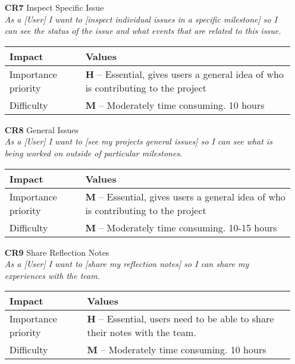 \begin{itemize}
    \item[\textbf{CR7}] Inspect Specific Issue\\
        \textit{\small{As a [User] I want to [inspect individual issues in a specific milestone] so I can see the status of the issue and what events that are related to this issue.}}

        \begin{tabular}{| l | p{8cm} |}
            \hline
            \rowcolor[gray]{0.8}
            \textbf{Impact} & \textbf{Values} \\
            \hline
            Importance priority & \textbf{H} -- Essential, gives users a general idea of who is contributing to the project\\
            Difficulty & \textbf{M} -- Moderately time consuming. 10 hours\\
            \hline
        \end{tabular}
    \vspace{0.5cm}

    \item[\textbf{CR8}] General Issues\\
        \textit{\small{As a [User] I want to [see my projects general issues] so I can see what is being worked on outside of particular milestones.}}

        \begin{tabular}{| l | p{8cm} |}
            \hline
            \rowcolor[gray]{0.8}
            \textbf{Impact} & \textbf{Values} \\
            \hline
            Importance priority & \textbf{M} -- Essential, gives users a general idea of who is contributing to the project\\
            Difficulty & \textbf{M} -- Moderately time consuming. 10-15 hours\\
            \hline
        \end{tabular}
    \vspace{0.5cm}

    \item[\textbf{CR9}] Share Reflection Notes\\
        \textit{\small{As a [User] I want to [share my reflection notes] so I can share my experiences with the team.}}

        \begin{tabular}{| l | p{8cm} |}
            \hline
            \rowcolor[gray]{0.8}
            \textbf{Impact} & \textbf{Values} \\
            \hline
            Importance priority & \textbf{H} -- Essential, users need to be able to share their notes with the team.\\
            Difficulty & \textbf{M} -- Moderately time consuming. 10 hours\\
            \hline
        \end{tabular}
    \vspace{0.5cm}


\end{itemize}
